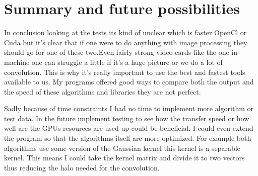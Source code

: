 \chapter{Summary and future possibilities}

In conclusion looking at the tests its kind of unclear which is faster OpenCl or Cuda but it's clear that if one were to do anything with image processing they should go for one of these two.Even fairly strong video cards like the one in machine one can struggle a little if it's a huge picture or we do a lot of convolution. This is why it's really important to use the best and fastest tools available to us. My programs offered good ways to compare both the output and the speed of these algorithms and libraries they are not perfect. 

Sadly because of time constraints I had no time to implement more algorithm or test data. In the future implement testing to see how the transfer speed or how well are the \ac{GPU}s resources are used up could be beneficial. I could even extend the program so that the algorithms itself are more optimized. For example both algorithms use some version of the Gaussian kernel this kernel is a separable kernel. This means I could take the kernel matrix and divide it to two vectors thus reducing the halo needed for the convolution.